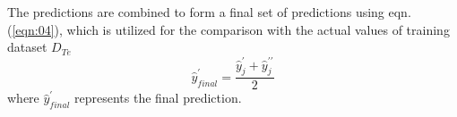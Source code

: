 \documentclass[sn-mathphys,Numbered]{sn-jnl}
\theoremstyle{thmstyleone}
\theoremstyle{thmstyletwo}
\theoremstyle{thmstylethree}
\begin{document}
The predictions are combined to form a final set of predictions using eqn. (\ref{eqn:04}), which is utilized for the comparison with the actual values of training dataset $D_{Te}$
\begin{equation}
\label{eqn:04}
\hat{y}_{final}^{\prime}=\frac{\hat{y}_j^{\prime}+\hat{y}_j^{\prime\prime}}{2}
\end{equation}
where $\hat{y}_{final}^{\prime}$ represents the final prediction.




    


\end{document}
